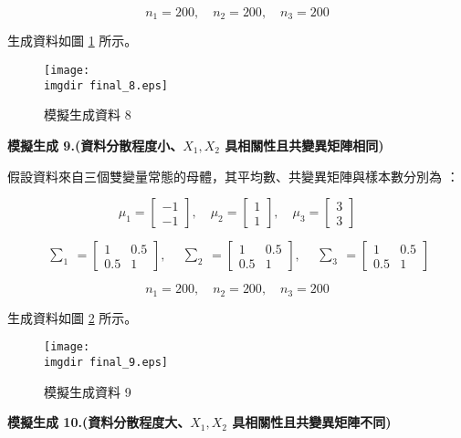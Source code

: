 \[n_1 = 200, \quad n_2 = 200, \quad n_3 = 200\]

生成資料如圖 \ref{fig:final_8} 所示。
\begin{figure}[H]
    \centering
        \texttt{[image: \\imgdir final\_8.eps]}
    \caption{模擬生成資料 8}
    \label{fig:final_8}
\end{figure}

\textbf{\large 模擬生成 9.(資料分散程度小、$X_1, X_2$ 具相關性且共變異矩陣相同)}

假設資料來自三個雙變量常態的母體，其平均數、共變異矩陣與樣本數分別為 ：

\[\mu_1 = \begin{bmatrix}
-1 \\
-1
\end{bmatrix}, \quad \mu_2 = \begin{bmatrix}
1 \\
1
\end{bmatrix}, \quad \mu_3 = \begin{bmatrix}
3 \\
3
\end{bmatrix}\]

\[\begin{matrix} \sum_{1} \end{matrix} = \begin{bmatrix}
1 & 0.5\\
0.5 & 1
\end{bmatrix}, \quad \begin{matrix} \sum_{2} \end{matrix} = \begin{bmatrix}
1 & 0.5\\
0.5 & 1
\end{bmatrix}, \quad \begin{matrix} \sum_{3} \end{matrix} = \begin{bmatrix}
1 & 0.5\\
0.5 & 1
\end{bmatrix}\]

\[n_1 = 200, \quad n_2 = 200, \quad n_3 = 200\]

生成資料如圖 \ref{fig:final_9} 所示。
\begin{figure}[H]
    \centering
        \texttt{[image: \\imgdir final\_9.eps]}
    \caption{模擬生成資料 9}
    \label{fig:final_9}
\end{figure}

\textbf{\large 模擬生成 10.(資料分散程度大、$X_1, X_2$ 具相關性且共變異矩陣不同)}

